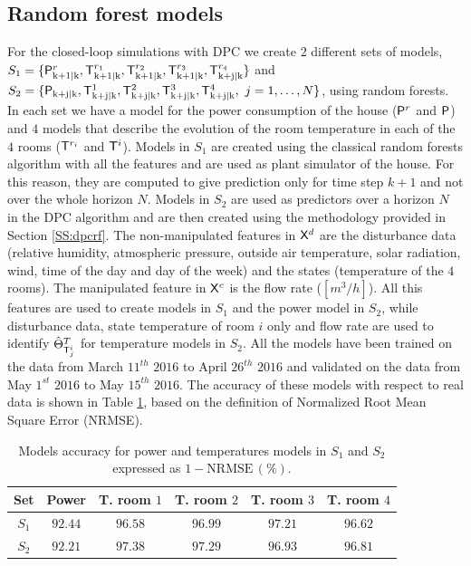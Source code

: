 \subsection{Random forest models} For the closed-loop simulations with DPC we create $2$ different sets of models, $S_1 = \{\mathsf{P}^{r}_{\mathrm{k+1|k}},\mathsf{T}^{r_1}_{\mathrm{k+1|k}},\mathsf{T}^{r_2}_{\mathrm{k+1|k}},\mathsf{T}^{r_3}_{\mathrm{k+1|k}},\mathsf{T}^{r_4}_{\mathrm{k+j|k}}\}$ and $S_2 = \{\tP_{\mathrm{k+j|k}},\tT^{1}_{\mathrm{k+j|k}},\tT^{2}_{\mathrm{k+j|k}},\\\tT^{3}_{\mathrm{k+j|k}},\tT^{4}_{\mathrm{k+j|k}},\ j = 1,\ldots,N\}$, using random forests. In each set we have a model for the power consumption of the house ($\mathsf{P}^{r}$ and $\mathsf{P}$) and $4$ models that describe the evolution of the room temperature in each of the $4$ rooms ($\mathsf{T}^{r_i}$ and $\mathsf{T}^i$). Models in $S_1$ are created using the classical random forests algorithm with all the features and are used as plant simulator of the house. For this reason, they are computed to give prediction only for time step $k+1$ and not over the whole horizon $N$. Models in $S_2$ are used as predictors over a horizon $N$ in the DPC algorithm and are then created using the methodology provided in Section \ref{SS:dpcrf}. The non-manipulated features in $\mathsf{X}^d$ are the disturbance data (relative humidity, atmospheric pressure, outside air temperature, solar radiation, wind, time of the day and day of the week) and the states (temperature of the $4$ rooms). The manipulated feature in $\mathsf{X}^c$ is the flow rate ($[m^3/h]$). All this features are used to create models in $S_1$ and the power model in $S_2$, while disturbance data, state temperature of room $i$ only and flow rate are used to identify $\hat{\Theta}^{T}_{\mathsf{T}^i_j}$ for temperature models in $S_2$. All the models have been trained on the data from March $11^{th}$ $2016$ to April $26^{th}$ $2016$ and validated on the data from May $1^{st}$ $2016$ to May $15^{th}$ $2016$. The accuracy of these models with respect to real data is shown in Table \ref{T:S1accuracy}, based on the definition of Normalized Root Mean Square Error (NRMSE).

\begin{table}[h!]
	\centering
	\begin{tabular}{cccccc}
		\toprule
		Set       & Power   & T. room $1$ & T. room $2$ & T. room $3$ & T. room $4$  \\ 
		\midrule
		$S_1$     & $92.44$ & $96.58$     & $96.99$     & $97.21$     & $96.62$\\
		$S_2$     & $92.21$ & $97.38$     & $97.29$     & $96.93$     & $96.81$\\
		\bottomrule
	\end{tabular}
	\caption{Models accuracy for power and temperatures models in $S_1$ and $S_2$ expressed as $\mathrm{1-NRMSE}\,(\%)$.}
	\captionsetup{justification=centering}
	\label{T:S1accuracy}
\end{table}

